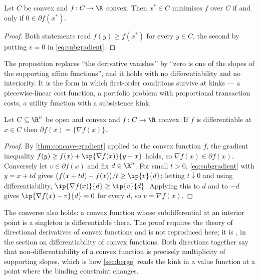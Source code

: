 \begin{proposition}\label{prop:subgradient-optimal}
	Let $C$ be convex and $f\colon C\to\R$ convex. Then $x^\ast\in C$ minimises $f$
	over $C$ if and only if $0\in\partial f(x^\ast)$.
\end{proposition}

\begin{proof}
	Both statements read $f(y)\geq f(x^\ast)$ for every $y\in C$, the second by
	putting $v=0$ in \eqref{eq:subgradient}.
\end{proof}

The proposition replaces ``the derivative vanishes'' by ``zero is one of the
slopes of the supporting affine functions'', and it holds with no
differentiability and no interiority. It is the form in which first-order
conditions survive at kinks --- a piecewise-linear cost function, a portfolio
problem with proportional transaction costs, a utility function with a
subsistence kink.

\begin{proposition}\label{prop:subdiff-gradient}
	Let $C\subseteq\R^n$ be open and convex and $f\colon C\to\R$ convex. If $f$ is
	differentiable at $x\in C$ then $\partial f(x)=\{\nabla f(x)\}$.
\end{proposition}

\begin{proof}
	By \autoref{thm:concave-gradient} applied to the convex function $f$, the
	gradient inequality $f(y)\geq f(x)+\ip{\nabla f(x)}{y-x}$ holds, so
	$\nabla f(x)\in\partial f(x)$. Conversely let $v\in\partial f(x)$ and fix
	$d\in\R^n$. For small $t>0$, \eqref{eq:subgradient} with $y=x+td$ gives
	$\bigl(f(x+td)-f(x)\bigr)/t\geq\ip{v}{d}$; letting $t\downarrow0$ and using
	differentiability, $\ip{\nabla f(x)}{d}\geq\ip{v}{d}$. Applying this to $d$ and
	to $-d$ gives $\ip{\nabla f(x)-v}{d}=0$ for every $d$, so $v=\nabla f(x)$.
\end{proof}

The converse also holds: a convex function whose subdifferential at an interior
point is a singleton is differentiable there. The proof requires the theory of
directional derivatives of convex functions and is not reproduced here; it is
\textcite[Thm.~25.1]{rockafellar1970convex}, in the section on
differentiability of convex functions. Both directions together say that
non-differentiability of a convex function is precisely multiplicity of
supporting slopes, which is how \autoref{sec:berge} reads the kink in a value
function at a point where the binding constraint changes.

